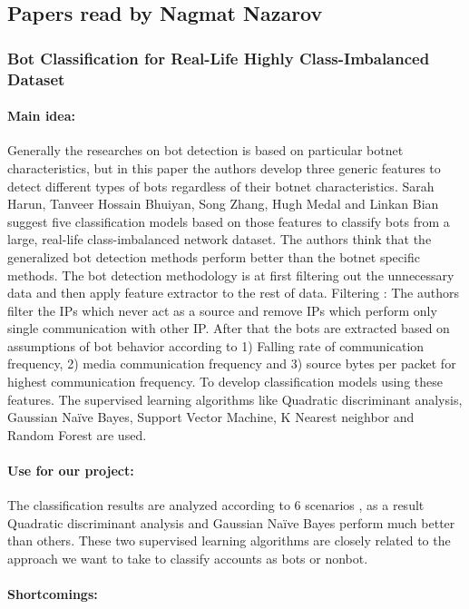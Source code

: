 \subsection{Papers read by Nagmat Nazarov}

\subsubsection{Bot Classification for Real-Life Highly Class-Imbalanced Dataset}

\paragraph{Main idea:}
Generally the researches on bot detection is based on particular botnet characteristics, but in this paper the authors develop three generic features to detect different types of bots regardless of their botnet characteristics. Sarah Harun, Tanveer Hossain Bhuiyan, Song Zhang, Hugh Medal and Linkan Bian~\cite{harun2017bot} suggest five classification models based on those features to classify bots from a large, real-life class-imbalanced network dataset. The authors think that the generalized bot detection methods perform better than the botnet specific methods. 
The bot detection methodology is at first filtering out the unnecessary data and then apply feature extractor to the rest of data. Filtering : The authors filter the IPs which never act as a source and remove IPs which perform only single communication with other IP. After that the bots are extracted based on assumptions of bot behavior according to 1) Falling rate of communication frequency, 2) media communication frequency and 3) source bytes per packet for highest communication frequency.  To develop classification models using these features. The supervised learning algorithms like Quadratic discriminant analysis, Gaussian Naïve Bayes, Support Vector Machine, K Nearest neighbor and Random Forest are used. 
\paragraph{Use for our project:}
The classification results are analyzed according to 6 scenarios , as a result Quadratic discriminant analysis and Gaussian Naïve Bayes perform much better than others. These two supervised learning algorithms are closely related to the approach we want to take to classify accounts as bots or nonbot.  
\paragraph{Shortcomings:}

